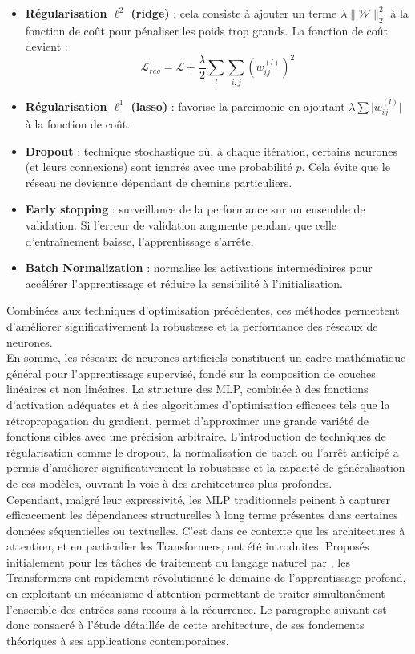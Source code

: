 \begin{itemize}
    \item \textbf{Régularisation \( \ell^2 \) (ridge)} : cela consiste à ajouter un terme \( \lambda \|\mathbf{\mathcal{W}}\|_2^2 \) à la fonction de coût pour pénaliser les poids trop grands. La fonction de coût devient :
    \begin{equation}
        \mathcal{L}_{reg} = \mathcal{L} + \frac{\lambda}{2} \sum_{l} \sum_{i,j} \left(w_{ij}^{(l)}\right)^2
    \end{equation}
    \item \textbf{Régularisation \( \ell^1 \) (lasso)} : favorise la parcimonie en ajoutant \( \displaystyle{\lambda \sum |w_{ij}^{(l)}}| \) à la fonction de coût.
    \item \textbf{Dropout} : technique stochastique où, à chaque itération, certains neurones (et leurs connexions) sont ignorés avec une probabilité \( p \). Cela évite que le réseau ne devienne dépendant de chemins particuliers.
    \item \textbf{Early stopping} : surveillance de la performance sur un ensemble de validation. Si l'erreur de validation augmente pendant que celle d’entraînement baisse, l’apprentissage s'arrête.
    \item \textbf{Batch Normalization} : normalise les activations intermédiaires pour accélérer l'apprentissage et réduire la sensibilité à l'initialisation.
\end{itemize}

Combinées aux techniques d’optimisation précédentes, ces méthodes permettent d’améliorer significativement la robustesse et la performance des réseaux de neurones.\\

En somme, les réseaux de neurones artificiels constituent un cadre mathématique général pour l'apprentissage supervisé, fondé sur la composition de couches linéaires et non linéaires. La structure des MLP, combinée à des fonctions d’activation adéquates et à des algorithmes d’optimisation efficaces tels que la rétropropagation du gradient, permet d’approximer une grande variété de fonctions cibles avec une précision arbitraire. L’introduction de techniques de régularisation comme le dropout, la normalisation de batch ou l’arrêt anticipé a permis d’améliorer significativement la robustesse et la capacité de généralisation de ces modèles, ouvrant la voie à des architectures plus profondes.\\

Cependant, malgré leur expressivité, les MLP traditionnels peinent à capturer efficacement les dépendances structurelles à long terme présentes dans certaines données séquentielles ou textuelles. C’est dans ce contexte que les architectures à attention, et en particulier les Transformers, ont été introduites. Proposés initialement pour les tâches de traitement du langage naturel par \citep{vaswani2017attention}, les Transformers ont rapidement révolutionné le domaine de l’apprentissage profond, en exploitant un mécanisme d’attention permettant de traiter simultanément l’ensemble des entrées sans recours à la récurrence. Le paragraphe suivant est donc consacré à l’étude détaillée de cette architecture, de ses fondements théoriques à ses applications contemporaines.

